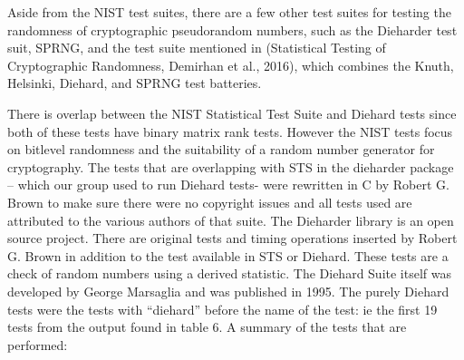 \documentclass[conference]{IEEEtran}
\begin{document}
Aside from the NIST test suites, there are a few other test suites for testing the randomness of cryptographic pseudorandom numbers, such as the Dieharder test suit, SPRNG, and the test suite mentioned in  (Statistical Testing of Cryptographic Randomness, Demirhan et al., 2016), which combines the Knuth, Helsinki, Diehard, and SPRNG test batteries.

There is overlap between the NIST Statistical Test Suite and Diehard tests since both of these tests have binary matrix rank tests. However the NIST tests focus on bitlevel randomness and the suitability of a random number generator for cryptography. The tests that are overlapping with STS in the dieharder package – which our group used to run Diehard tests- were rewritten in C by Robert G. Brown to make sure there were no copyright issues and all tests used are attributed to the various authors of that suite. The Dieharder library is an open source project. There are original tests and timing operations inserted by Robert G. Brown in addition to the test available in STS or Diehard. These tests are a check of random numbers using a derived statistic. The Diehard Suite itself was developed by George Marsaglia and was published in 1995. The purely Diehard tests were the tests with “diehard” before the name of the test: ie the first 19 tests from the output found in table 6. A summary of the tests that are performed:
\end{document}
